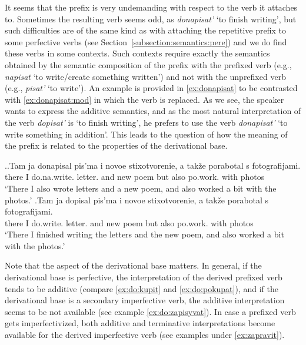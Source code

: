 It seems that the prefix  is very undemanding with respect to the verb it attaches to. Sometimes the resulting verb seems odd, as \textit{donapisat'} `to finish writing', but such difficulties are of the same kind as with attaching the repetitive prefix  to some perfective verbs (see Section~\ref{subsection:semantics:pere}) and we do find these verbs in some contexts. Such contexts require exactly the semantics obtained by the semantic composition of the prefix  with the prefixed verb (e.g., \textit{napisat} `to write/create something written') and not with the unprefixed verb (e.g., \textit{pisat'} `to write'). An example is provided in \ref{ex:donapisat} to be contrasted with \ref{ex:donapisat:mod} in which the verb is replaced. As we see, the speaker wants to express the additive semantics, and as the most natural interpretation of the verb \textit{dopisat'} is `to finish writing', he prefers to use the verb \textit{donapisat'} `to write something in addition'. This leads to the question of how the meaning of the prefix is related to the properties of the derivational base.

\ex.\ag.\label{ex:donapisat}Tam ja donapisal pis'ma i novoe stixotvorenie, a tak\v{z}e porabotal s fotografijami.\\
there I do.na.write. letter. and new poem but also po.work. with photos\\
\trans `There I also wrote letters and a new poem, and also worked a bit with the photos.'
\bg.\label{ex:donapisat:mod}Tam ja dopisal pis'ma i novoe stixotvorenie, a tak\v{z}e porabotal s fotografijami.\\
there I do.write. letter. and new poem but also po.work. with photos\\
\trans `There I finished writing the letters and the new poem, and also worked a bit with the photos.'

Note that the aspect of the derivational base matters. In general, if the derivational base is perfective, the interpretation of the derived prefixed verb tends to be additive (compare \ref{ex:do:kupit} and \ref{ex:do:pokupat}), and if the derivational base is a secondary imperfective verb, the additive interpretation seems to be not available (see example \ref{ex:do:zapisyvat}). In case a prefixed verb gets imperfectivized, both additive and terminative interpretations become available for the derived imperfective verb (see examples under \ref{ex:zapravit}).

